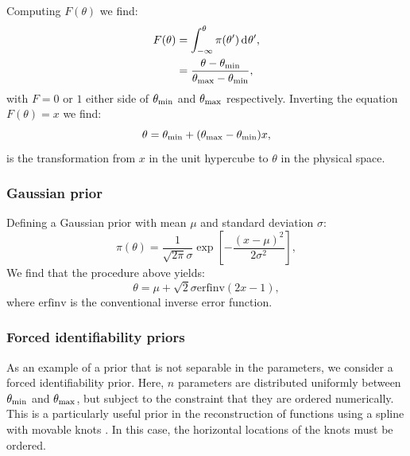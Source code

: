 Computing \(F(\theta)\) we find:
\begin{align}
  F(\theta) &= \int_{-\infty}^\theta \pi(\theta^\prime)\operatorname{d}^{}\!{\theta^\prime}, \nonumber\\
  &= \frac{\theta-\theta_{\mathrm{min}}}{\theta_{\mathrm{max}}-\theta_{\mathrm{min}}},
  \label{eqn:pc:calc_uniform_trans}
\end{align}
with \(F=0\) or \(1\) either side of \(\theta_{\mathrm{min}}\) and \(\theta_{\mathrm{max}}\) respectively. Inverting the equation \(F(\theta)=x\) we find:
\begin{equation}
  \theta = \theta_{\mathrm{min}}+(\theta_{\mathrm{max}}-\theta_{\mathrm{min}})x,
  \label{eqn:pc:uniform_trans}                           
\end{equation}
is the transformation from \(x\) in the unit hypercube to \(\theta\) in the physical space.

\subsubsection{Gaussian prior}
\label{sec:pc:gaussian_prior}
Defining a Gaussian prior with mean \(\mu\) and standard deviation \(\sigma\):
\begin{equation}
  \pi(\theta) = \frac{1}{\sqrt{2\pi}\sigma}\exp{\left[-\frac{{(x-\mu)}^2}{2\sigma^2}\right]},
  \label{eqn:pc:gaussian_prior}
\end{equation}
We find that the procedure above yields:
\begin{equation}
  \theta = \mu + \sqrt{2}\sigma\text{erfinv}(2x-1),
  \label{eqn:pc:gaussian_trans}                           
\end{equation}
where \(\text{erfinv}\) is the conventional inverse error function.




\subsubsection{Forced identifiability priors}
\label{sec:pc:forced_identifiablility}

As an example of a prior that is not separable in the parameters, we consider a forced identifiability prior. Here, \(n\) parameters are distributed uniformly between \(\theta_{\mathrm{min}}\) and \(\theta_{\mathrm{max}}\), but subject to the constraint that they are ordered numerically. This is a particularly useful prior in the reconstruction of functions using a spline with movable knots \citep{vazquez_knots,knottedsky1,knottedsky2,planck2015-a24}. In this case, the  horizontal locations of the knots must be ordered.

